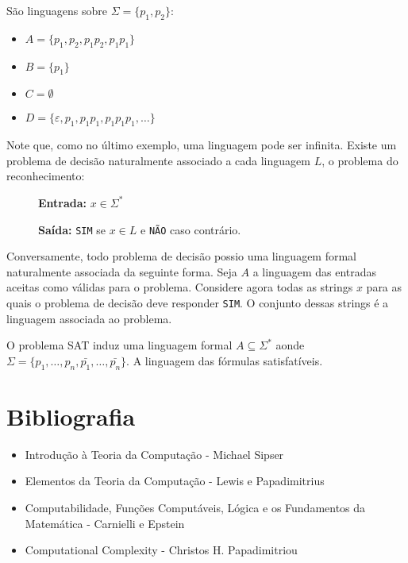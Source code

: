 \begin{example}
São linguagens sobre $\Sigma = \{p_1, p_2\}$:
\begin{itemize}
\item[] $A = \{p_1, p_2, p_1p_2, p_1p_1\}$
\item[] $B = \{p_1\}$
\item[] $C = \emptyset$
\item[] $D = \{\varepsilon, p_1, p_1p_1, p_1p_1p_1, \dots\}$ 
\end{itemize}
\end{example}

Note que, como no último exemplo, uma linguagem pode ser infinita.
Existe um problema de decisão naturalmente associado a cada linguagem $L$, o problema do reconhecimento:

\begin{description}
\item[] {\bf Entrada:} $x \in \Sigma^*$
\item[] {\bf Saída:} {\tt SIM} se $x \in L$ e {\tt NÃO} caso contrário.
\end{description}

Conversamente, todo problema de decisão possio uma linguagem formal naturalmente associada da seguinte forma.
Seja $A$ a linguagem das entradas aceitas como válidas para o problema.
Considere agora todas as strings $x$ para as quais o problema de decisão deve responder {\tt SIM}.
O conjunto dessas strings é a linguagem associada ao problema.

\begin{example}
O problema SAT induz uma linguagem formal $A \subseteq \Sigma^*$ aonde $\Sigma = \{p_1, \dots, p_n, \bar{p_1}, \dots, \bar{p_n}\}$.
A linguagem das fórmulas satisfatíveis.  
\end{example}



\section{Bibliografia}
\label{sec:biblio}

\begin{itemize}
\item Introdução à Teoria da Computação - Michael Sipser
\item Elementos da Teoria da Computação - Lewis e Papadimitrius
\item Computabilidade, Funções Computáveis, Lógica e os Fundamentos da Matemática - Carnielli e Epstein
\item Computational Complexity - Christos H. Papadimitriou
\end{itemize}